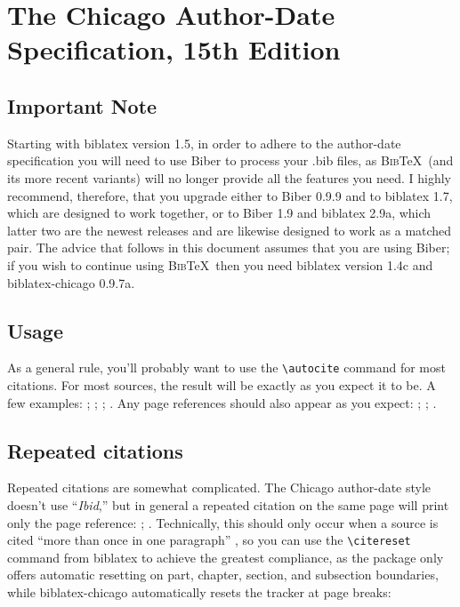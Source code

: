 \documentclass[a4paper,12pt]{report}
\newcommand{\cmd}[1]{\texttt{\textbackslash #1}}
\begin{document}
\section*{The Chicago Author-Date Specification, 15th Edition}
\label{sec:spec}

\subsection*{Important Note}
\label{bibernote}

Starting with \textsf{biblatex} version 1.5, in order to adhere to the
author-date specification you will need to use \textsf{Biber} to
process your .bib files, as \textsc{Bib}\TeX\ (and its more recent
variants) will no longer provide all the features you need.  I highly
recommend, therefore, that you upgrade either to \textsf{Biber} 0.9.9
and to \textsf{biblatex} 1.7, which are designed to work together, or
to \textsf{Biber} 1.9 and \textsf{biblatex} 2.9a, which latter two are
the newest releases and are likewise designed to work as a matched
pair.  The advice that follows in this document assumes that you are
using \textsf{Biber}; if you wish to continue using \textsc{Bib}\TeX\
then you need \textsf{biblatex} version 1.4c and
\textsf{biblatex-chicago} 0.9.7a.

\subsection*{Usage}
\label{usage}

As a general rule, you'll probably want to use the \cmd{autocite}
command for most citations.  For most sources, the result will be
exactly as you expect it to be.  A few examples:
\autocite{adorno:benj}; \autocite{ashbrook:brain};
\autocite{babb:peru}; \autocite{barcott:review:15}.  Any page
references should also appear as you expect: \autocite[338]{batson};
\autocite[79]{beattie:crime}; \autocite[36]{boxer:china}.

\subsection*{Repeated citations}
\label{sec:ibidem}

Repeated citations are somewhat complicated.  The Chicago author-date
style doesn't use \enquote{\emph{Ibid},} but in general a repeated
citation on the same page will print only the page reference:
\autocite{browning:aurora}; \autocite[45]{browning:aurora}.
Technically, this should only occur when a source is cited
\enquote{more than once in one paragraph}
\autocite[16.114]{chicago:manual:15}, so you can use the
\cmd{citereset} command from \textsf{biblatex} to achieve the greatest
compliance, as the package only offers automatic resetting on part,
chapter, section, and subsection boundaries, while
\textsf{biblatex-chicago} automatically resets the tracker at page
breaks:
\end{document}
